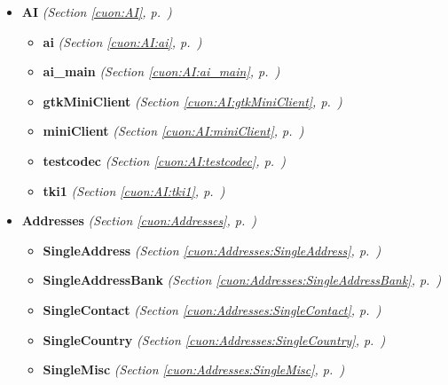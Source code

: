 \begin{itemize}
\setlength{\parskip}{0ex}
\item \textbf{AI}
  \textit{(Section \ref{cuon:AI}, p.~\pageref{cuon:AI})}

  \begin{itemize}
\setlength{\parskip}{0ex}
    \item \textbf{ai}
  \textit{(Section \ref{cuon:AI:ai}, p.~\pageref{cuon:AI:ai})}

    \item \textbf{ai\_main}
  \textit{(Section \ref{cuon:AI:ai_main}, p.~\pageref{cuon:AI:ai_main})}

    \item \textbf{gtkMiniClient}
  \textit{(Section \ref{cuon:AI:gtkMiniClient}, p.~\pageref{cuon:AI:gtkMiniClient})}

    \item \textbf{miniClient}
  \textit{(Section \ref{cuon:AI:miniClient}, p.~\pageref{cuon:AI:miniClient})}

    \item \textbf{testcodec}
  \textit{(Section \ref{cuon:AI:testcodec}, p.~\pageref{cuon:AI:testcodec})}

    \item \textbf{tki1}
  \textit{(Section \ref{cuon:AI:tki1}, p.~\pageref{cuon:AI:tki1})}

  \end{itemize}
\item \textbf{Addresses}
  \textit{(Section \ref{cuon:Addresses}, p.~\pageref{cuon:Addresses})}

  \begin{itemize}
\setlength{\parskip}{0ex}
    \item \textbf{SingleAddress}
  \textit{(Section \ref{cuon:Addresses:SingleAddress}, p.~\pageref{cuon:Addresses:SingleAddress})}

    \item \textbf{SingleAddressBank}
  \textit{(Section \ref{cuon:Addresses:SingleAddressBank}, p.~\pageref{cuon:Addresses:SingleAddressBank})}

    \item \textbf{SingleContact}
  \textit{(Section \ref{cuon:Addresses:SingleContact}, p.~\pageref{cuon:Addresses:SingleContact})}

    \item \textbf{SingleCountry}
  \textit{(Section \ref{cuon:Addresses:SingleCountry}, p.~\pageref{cuon:Addresses:SingleCountry})}

    \item \textbf{SingleMisc}
  \textit{(Section \ref{cuon:Addresses:SingleMisc}, p.~\pageref{cuon:Addresses:SingleMisc})}


\end{itemize}
\end{itemize}
